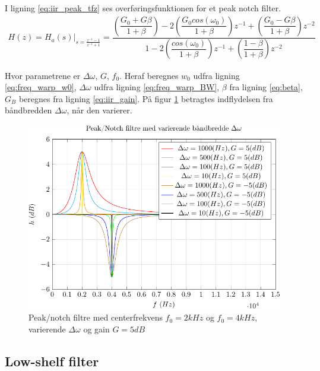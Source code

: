     I ligning \ref{eq:iir_peak_tfz} ses overføringsfunktionen for et peak notch filter.
   \begin{align}
    H(z) = H_a(s)\bigg|_{s = \frac{z^{-1} -1 }{z^{-1} + 1}} = 
    \dfrac{\left(\dfrac{G_0 + G \beta}{1 + \beta} \right)- 2 \left(\dfrac{G_0 cos( \omega_0)}{1 +\beta} \right)z^{-1} + \left(\dfrac{ G_0 - G \beta}{1 + \beta }\right) z^{-2}}{1 - 2 \left(\dfrac{cos(\omega_0)}{1 + \beta}\right)z^{-1} + \left( \dfrac{1 - \beta}{1 + \beta} \right) z^{-2}}
    \label{eq:iir_peak_tfz}
   \end{align}

   Hvor parametrene er $\Delta \omega$, $G$, $f_0$. Heraf beregnes $w_0$ udfra ligning \ref{eq:freq_warp_w0}, $\Delta \omega$ udfra ligning \ref{eq:freq_warp_BW}, $\beta$ fra ligning \ref{eq:beta}, $G_B$ beregnes fra ligning \ref{eq:iir_gain}.
   På figur \ref{fig:iir_peak} betragtes indflydelsen fra båndbredden $\Delta \omega$, når den varierer.

 \begin{figure}
    \centering
         \includegraphics{figure/iir_peak-crop.pdf}
        \caption{Peak/notch filtre med centerfrekvens $f_0 = 2kHz$ og $f_0 = 4kHz$, varierende $\Delta \omega$ og gain $G=5dB$}
        \label{fig:iir_peak}   
    \end{figure} 
\FloatBlock

     \subsection{Low-shelf filter}

	
